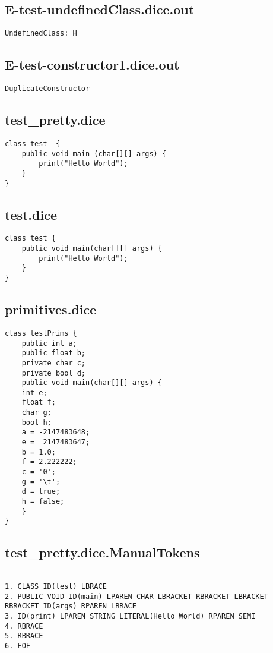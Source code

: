 \subsection{E-test-undefinedClass.dice.out}
\begin{verbatim}
UndefinedClass: H

\end{verbatim}
\pagebreak
\subsection{E-test-constructor1.dice.out}
\begin{verbatim}
DuplicateConstructor 

\end{verbatim}
\pagebreak
\subsection{test\_pretty.dice}
\begin{verbatim}
class test  {
	public void main (char[][] args) {
		print("Hello World");
	}
}

\end{verbatim}
\pagebreak
\subsection{test.dice}
\begin{verbatim}
class test {
	public void main(char[][] args) {
		print("Hello World");
	}
}
\end{verbatim}
\pagebreak
\subsection{primitives.dice}
\begin{verbatim}
class testPrims {
	public int a;
	public float b;
	private char c;
	private bool d;
	public void main(char[][] args) {
	int e;
	float f;
	char g;
	bool h;
	a = -2147483648;
	e =  2147483647;
	b = 1.0;
	f = 2.222222;
	c = '0';
	g = '\t';
	d = true;
	h = false;
	}
}
\end{verbatim}
\pagebreak
\subsection{test\_pretty.dice.ManualTokens}
\begin{verbatim}

1. CLASS ID(test) LBRACE
2. PUBLIC VOID ID(main) LPAREN CHAR LBRACKET RBRACKET LBRACKET RBRACKET ID(args) RPAREN LBRACE
3. ID(print) LPAREN STRING_LITERAL(Hello World) RPAREN SEMI
4. RBRACE
5. RBRACE
6. EOF

\end{verbatim}
\pagebreak
